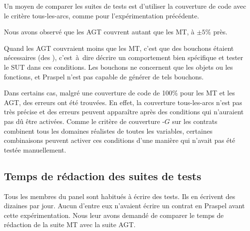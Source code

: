 
Un moyen de comparer les suites de tests est d'utiliser la couverture de code
avec le critère tous-les-arcs, comme pour l'expérimentation précédente.

Nous avons observé que les AGT couvrent autant que les MT, à $\pm 5\%$ près.

Quand les AGT couvraient moins que les MT, c'est que des bouchons étaient
nécessaires (des ), c'est~à~dire décrire un comportement bien
spécifique et tester le SUT dans ces conditions. Les bouchons ne concernent que
les objets ou les fonctions, et Praspel n'est pas capable de générer de tels
bouchons.

Dans certains cas, malgré une couverture de code de 100\% pour les MT et les
AGT, des erreurs ont été trouvées. En effet, la couverture tous-les-arcs n'est
pas très précise et des erreurs peuvent apparaître après des conditions qui
n'auraient pas dû être activées. Comme le critère de couverture
-$G$ sur les contrats combinent tous les domaines réalistes de
toutes les variables, certaines combinaisons peuvent activer ces conditions
d'une manière qui n'avait pas été testée manuellement.

\subsection{Temps de rédaction des suites de tests}

%

Tous les membres du panel sont habitués à écrire des tests. Ils en écrivent des
dizaines par jour. Aucun d'entre eux n'avaient écrire un contrat en Praspel
avant cette expérimentation. Nous leur avons demandé de comparer le temps de
rédaction de la suite MT avec la suite AGT.

